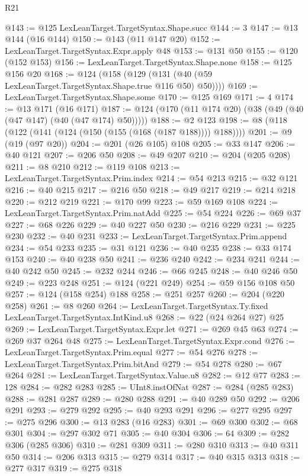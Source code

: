 \begin{lexlean}{R21}
\begin{coremodule}
@143 := @125 LexLeanTarget.TargetSyntax.Shape.succ
@144 := 3
@147 := @13 @144 (@16 @144)
@150 := @143 (@11 @147 @20)
@152 := LexLeanTarget.TargetSyntax.Expr.apply @48
@153 := @131 @50
@155 := @120 (@152 @153)
@156 := LexLeanTarget.TargetSyntax.Shape.none
@158 := @125 @156 @20
@168 := @124 (@158 (@129 (@131 (@40 (@59 LexLeanTarget.TargetSyntax.Shape.true @116 @50) @50))))
@169 := LexLeanTarget.TargetSyntax.Shape.some
@170 := @125 @169
@171 := 4
@174 := @13 @171 (@16 @171)
@187 := @124 (@170 (@11 @174 @20) (@38 (@49 (@40 (@47 @147) (@40 (@47 @174) @50)))))
@188 := @2 @123
@198 := @8 (@118 (@122 (@141 (@124 (@150 (@155 (@168 (@187 @188)))) @188))))
@201 := @9 (@19 (@97 @20))
@204 := @201 (@26 @105) @108
@205 := @33 @147
@206 := @40 @121
@207 := @206 @50
@208 := @49 @207
@210 := @204 (@205 @208)
@211 := @8 @210
@212 := @119 @108
@213 := LexLeanTarget.TargetSyntax.Prim.index
@214 := @54 @213
@215 := @32 @121
@216 := @40 @215
@217 := @216 @50
@218 := @49 @217
@219 := @214 @218
@220 := @212 @219
@221 := @170 @99
@223 := @59 @169 @108
@224 := LexLeanTarget.TargetSyntax.Prim.natAdd
@225 := @54 @224
@226 := @69 @37
@227 := @68 @226
@229 := @40 @227 @50
@230 := @216 @229
@231 := @225 @230
@232 := @40 @231
@233 := LexLeanTarget.TargetSyntax.Prim.append
@234 := @54 @233
@235 := @31 @121
@236 := @40 @235
@238 := @33 @174 @153
@240 := @40 @238 @50
@241 := @236 @240
@242 := @234 @241
@244 := @40 @242 @50
@245 := @232 @244
@246 := @66 @245
@248 := @40 @246 @50
@249 := @223 @248
@251 := @124 (@221 @249)
@254 := @59 @156 @108 @50
@257 := @124 (@158 @254) @188
@258 := @251 @257
@260 := @204 (@220 @258)
@261 := @8 @260
@264 := LexLeanTarget.TargetSyntax.Ty.fixed LexLeanTarget.TargetSyntax.IntKind.u8
@268 := @22 (@24 @264 @27) @25
@269 := LexLeanTarget.TargetSyntax.Expr.let
@271 := @269 @45 @63
@274 := @269 @37 @264 @48
@275 := LexLeanTarget.TargetSyntax.Expr.cond
@276 := LexLeanTarget.TargetSyntax.Prim.equal
@277 := @54 @276
@278 := LexLeanTarget.TargetSyntax.Prim.bitAnd
@279 := @54 @278
@280 := @67 @264
@281 := LexLeanTarget.TargetSyntax.Value.u8
@282 := @12 @77
@283 := 128
@284 := @282 @283
@285 := UInt8.instOfNat
@287 := @284 (@285 @283)
@288 := @281 @287
@289 := @280 @288
@291 := @40 @289 @50
@292 := @206 @291
@293 := @279 @292
@295 := @40 @293 @291
@296 := @277 @295
@297 := @275 @296
@300 := @13 @283 (@16 @283)
@301 := @69 @300
@302 := @68 @301
@304 := @297 @302 @71
@305 := @40 @304
@306 := 64
@309 := @282 @306 (@285 @306)
@310 := @281 @309
@311 := @280 @310
@313 := @40 @311 @50
@314 := @206 @313
@315 := @279 @314
@317 := @40 @315 @313
@318 := @277 @317
@319 := @275 @318

\end{coremodule}
\end{lexlean}
